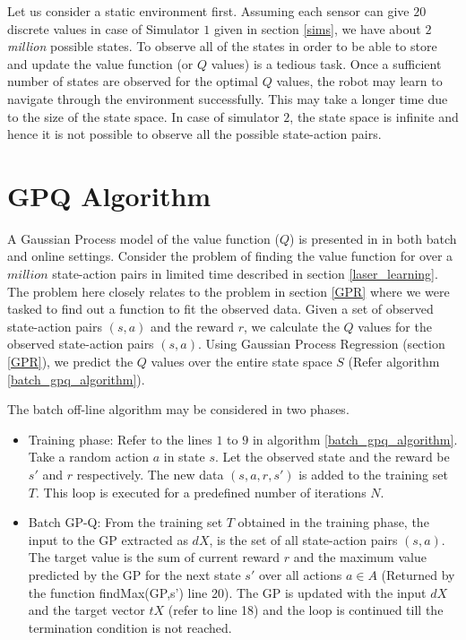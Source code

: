 \documentclass[12pt]{report}
\begin{document}
Let us consider a static environment first. Assuming each sensor can give $20$ discrete values in case of Simulator $1$ given in section \ref{sims}, we have about $2$ \textit{million} possible states. To observe all of the states in order to be able to store and update the value function (or $Q$ values) is a tedious task. Once a sufficient number of states are observed for the optimal $Q$ values, the robot may learn to navigate through the environment successfully. This may take a longer time due to the size of the state space. In case of simulator $2$, the state space is infinite and hence it is not possible to observe all the possible state-action pairs. 

\section{GPQ Algorithm}
 A Gaussian Process model of the value function ($Q$) is presented in \cite{chowdhary2014off} in both batch and online settings. Consider the problem of finding the value function for over a $million$ state-action pairs in limited time described in section \ref{laser_learning}. The problem here closely relates to the problem in section \ref{GPR} where we were tasked to find out a function to fit the observed data. Given a set of observed state-action pairs $(s,a)$ and the reward $r$, we calculate the $Q$ values for the observed state-action pairs $(s,a)$. Using Gaussian Process Regression (section \ref{GPR}), we predict the $Q$ values over the entire state space $S$ (Refer algorithm \ref{batch_gpq_algorithm}).\par
 The batch off-line algorithm may be considered in two phases.
 \begin{itemize}
\item Training phase: Refer to the lines $1$ to $9$ in algorithm \ref{batch_gpq_algorithm}. Take a random action $a$ in state $s$. Let the observed state and the reward be $s'$ and $r$ respectively. The new data $(s,a,r,s')$ is added to the training set $T$. This loop is executed for a predefined number of iterations $N$.
\item Batch GP-Q: From the training set $T$ obtained in the training phase, the input to the GP extracted as $dX$, is the set of all state-action pairs $(s,a)$. The target value is the sum of current reward $r$ and the maximum value predicted by the GP for the next state $s'$ over all actions $a \in A$ (Returned by the function findMax(GP,s') line 20). The GP is updated with the input $dX$ and the target vector $tX$ (refer to line 18) and the loop is continued till the termination condition is not reached.
\end{itemize}
\end{document}
